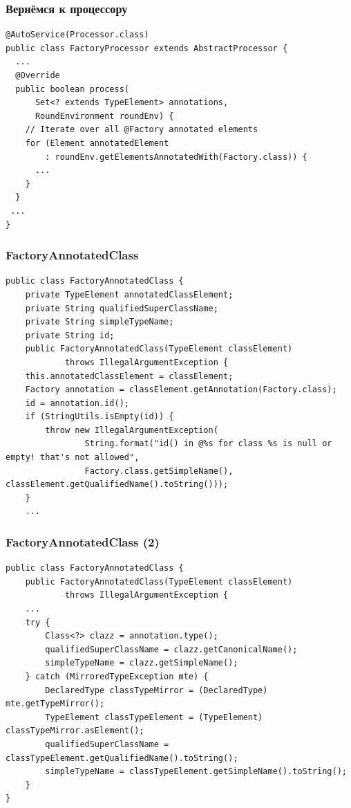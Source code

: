 \documentclass[xetex,mathserif,serif]{beamer}
\begin{document}
	\begin{frame}[fragile]
		\frametitle{Вернёмся к процессору}
		\begin{verbatim}
@AutoService(Processor.class)
public class FactoryProcessor extends AbstractProcessor {
  ...
  @Override
  public boolean process(
      Set<? extends TypeElement> annotations, 
      RoundEnvironment roundEnv) {
    // Iterate over all @Factory annotated elements
    for (Element annotatedElement 
        : roundEnv.getElementsAnnotatedWith(Factory.class)) {
      ...
    }
  }
 ...
}
		\end{verbatim}
\end{frame}

	\begin{frame}[fragile]
		\frametitle{FactoryAnnotatedClass}
		\begin{footnotesize}
			\begin{verbatim}
public class FactoryAnnotatedClass {
    private TypeElement annotatedClassElement; 
    private String qualifiedSuperClassName;
    private String simpleTypeName; 
    private String id;
    public FactoryAnnotatedClass(TypeElement classElement) 
            throws IllegalArgumentException {
    this.annotatedClassElement = classElement;
    Factory annotation = classElement.getAnnotation(Factory.class);
    id = annotation.id(); 
    if (StringUtils.isEmpty(id)) {
        throw new IllegalArgumentException(
                String.format("id() in @%s for class %s is null or empty! that's not allowed",
                Factory.class.getSimpleName(), classElement.getQualifiedName().toString()));
    }
    ...
			\end{verbatim}
		\end{footnotesize}
\end{frame}

	\begin{frame}[fragile]
		\frametitle{FactoryAnnotatedClass (2)}
		\begin{footnotesize}
			\begin{verbatim}
public class FactoryAnnotatedClass {
    public FactoryAnnotatedClass(TypeElement classElement) 
            throws IllegalArgumentException {
    ...
    try {
        Class<?> clazz = annotation.type();
        qualifiedSuperClassName = clazz.getCanonicalName();
        simpleTypeName = clazz.getSimpleName();
    } catch (MirroredTypeException mte) {
        DeclaredType classTypeMirror = (DeclaredType) mte.getTypeMirror();
        TypeElement classTypeElement = (TypeElement) classTypeMirror.asElement();
        qualifiedSuperClassName = classTypeElement.getQualifiedName().toString();
        simpleTypeName = classTypeElement.getSimpleName().toString();
    }
}
			\end{verbatim}
		\end{footnotesize}
\end{frame}
\end{document}
